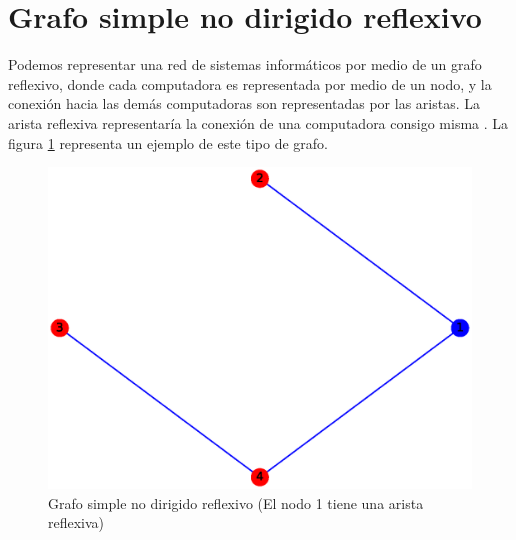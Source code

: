 \documentclass{article}
\begin{document}

\section{Grafo simple no dirigido reflexivo}
Podemos representar una red de sistemas informáticos por medio de un grafo reflexivo, donde cada computadora es representada por medio de un nodo, y la conexión hacia las demás computadoras son representadas por las aristas. La arista reflexiva representaría la conexión de una computadora consigo misma \cite{GSNDR}. La figura \ref{fig:GSNDR} representa un ejemplo de este tipo de grafo.
\begin{figure}[h!]
    \includegraphics[width=\textwidth]{3-GSNDC}
    \caption{Grafo simple no dirigido reflexivo (El nodo 1 tiene una arista reflexiva)}
    \label{fig:GSNDR}
\end{figure}



\end{document}
